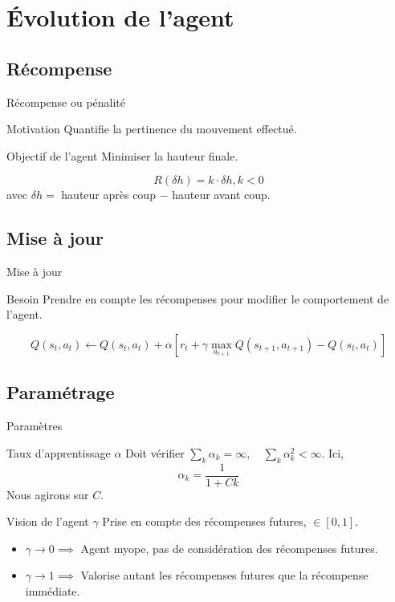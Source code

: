 \documentclass[tikz, footheight=2em]{beamer}
\begin{document}
\section{Évolution de l'agent}
\subsection{Récompense}
\begin{frame}[c]{Récompense ou pénalité}
  \begin{block}{Motivation}
    Quantifie la pertinence du mouvement effectué.
  \end{block}
  \pause{}
  \begin{block}{Objectif de l'agent}
    Minimiser la hauteur finale.
  \end{block}
  \pause{}
  \[ R(\delta h) = k \cdot \delta h, k < 0 \]
  avec \(\delta h =\) hauteur après coup \(-\) hauteur avant coup.
\end{frame}
\subsection{Mise à jour}
\begin{frame}[c]{Mise à jour}
  \begin{block}{Besoin}
    Prendre en compte les récompenses pour modifier le comportement de l'agent.
  \end{block}
  \pause{}
  \[
    Q(s_t, a_t) \leftarrow Q(s_t,a_t) + \alpha
    [r_t + \gamma \max_{a_{t+1}} Q(s_{t+1},a_{t+1}) - Q(s_t,a_t)]
  \]
\end{frame}

\subsection{Paramétrage}
\begin{frame}[c]{Paramètres}
  \begin{block}{Taux d'apprentissage \(\alpha\)}
    Doit vérifier \(\sum_{k} \alpha_k = \infty, \quad
    \sum_k \alpha_k^2 < \infty \).
    \pause{}
    Ici, \[ \alpha_k = \frac{1}{1 + Ck} \]
    Nous agirons sur \(C\).
  \end{block}
  \pause{}
  \begin{block}{Vision de l'agent \(\gamma\)}
    Prise en compte des récompenses futures, \(\in [0,1]\).
    \pause{}
    \begin{itemize}
      \item \(\gamma \to 0 \implies\) Agent myope, pas de considération des
        récompenses futures.
      \item \(\gamma \to 1 \implies\) Valorise autant les récompenses futures
        que la récompense immédiate.
    \end{itemize}
  \end{block}
\end{frame}
\end{document}
